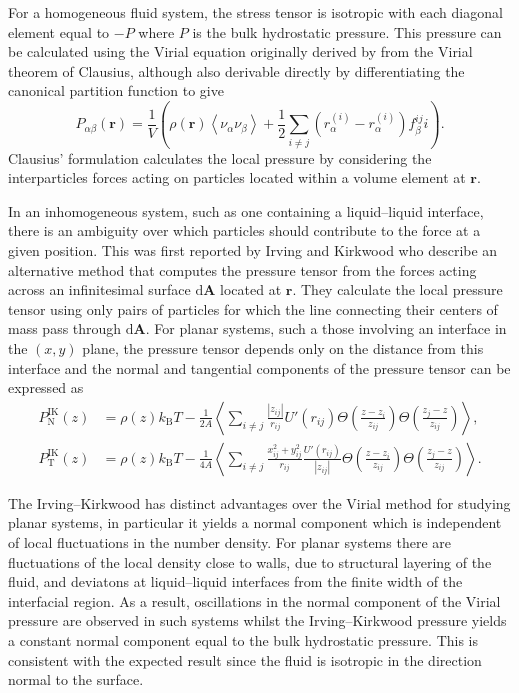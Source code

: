 For a homogeneous fluid system, the stress tensor is isotropic with each diagonal element equal to $- P$ where $P$ is the bulk hydrostatic pressure. 
This pressure can be calculated using the Virial equation originally derived by from the Virial theorem of Clausius\cite{Clausius}, although also derivable directly by differentiating the canonical partition function\cite{MolTheoryCap} to give
\begin{equation}
\label{VirialPressure}
P_{\alpha \beta}(\mathbf{r})=\frac{1}{V} \left( \rho(\mathbf{r})\left< \nu_{\alpha} \nu_{\beta} \right> + \frac{1}{2} \sum_{i \neq j} (r_{\alpha}^{(i)} - r_{\alpha}^{(i)})f_{\beta}^{ij}i \right).
\end{equation}
Clausius' formulation calculates the local pressure by considering the interparticles forces acting on particles located within a volume element at $\mathbf{r}$.

In an inhomogeneous system, such as one containing a liquid--liquid interface, there is an ambiguity over which particles should contribute to the force at a given position.\cite{MolTheoryCap,VarnikBinder,Rowlinson1982}
This was first reported by Irving and Kirkwood\cite{IrvingKirkwood1949,IrvingKirkwood1950} who describe an alternative method that computes the pressure tensor from the forces acting across an infinitesimal surface $\mathrm{d}\mathbf{A}$ located at $\mathbf{r}$.
They calculate the local pressure tensor using only pairs of particles for which the line connecting their centers of mass pass through $\mathrm{d}\mathbf{A}$.
For planar systems, such a those involving an interface in the $(x,y)$ plane, the pressure tensor depends only on the distance from this interface and the normal and tangential components of the pressure tensor can be expressed as
\begin{align}
\label{IKpressureN}
P_{\mathrm{N}}^{\mathrm{IK}}(z) &= \rho(z)k_{\mathrm{B}}T-\frac{1}{2A} \left< \sum_{i \neq j} \frac{|z_{ij}|}{r_{ij}} U'(r_{ij}) \Theta \left( \frac{z-z_{i}}{z_{ij}}\right) \Theta \left( \frac{z_{j} - z}{z_{ij}} \right) \right>,\\
\label{IKpressureT}
P_{\mathrm{T}}^{\mathrm{IK}}(z) &= \rho(z)k_{\mathrm{B}}T-\frac{1}{4A} \left< \sum_{i \neq j} \frac{x^{2}_{ij} + y^{2}_{ij}}{r_{ij}} \frac{U'(r_{ij})}{|z_{ij}|} \Theta \left( \frac{z-z_{i}}{z_{ij}}\right) \Theta \left( \frac{z_{j} - z}{z_{ij}} \right) \right>.
\end{align}

The Irving--Kirkwood has distinct advantages over the Virial method for studying planar systems, in particular it yields a normal component which is independent of local fluctuations in the number density.
For planar systems there are fluctuations of the local density close to walls, due to structural layering of the fluid, and deviatons at liquid--liquid interfaces from the finite width of the interfacial region.
As a result, oscillations in the normal component of the Virial pressure are observed in such systems\cite{VarnikBinder} whilst the Irving--Kirkwood pressure yields a constant normal component equal to the bulk hydrostatic pressure.
This is consistent with the expected result since the fluid is isotropic in the direction normal to the surface.

